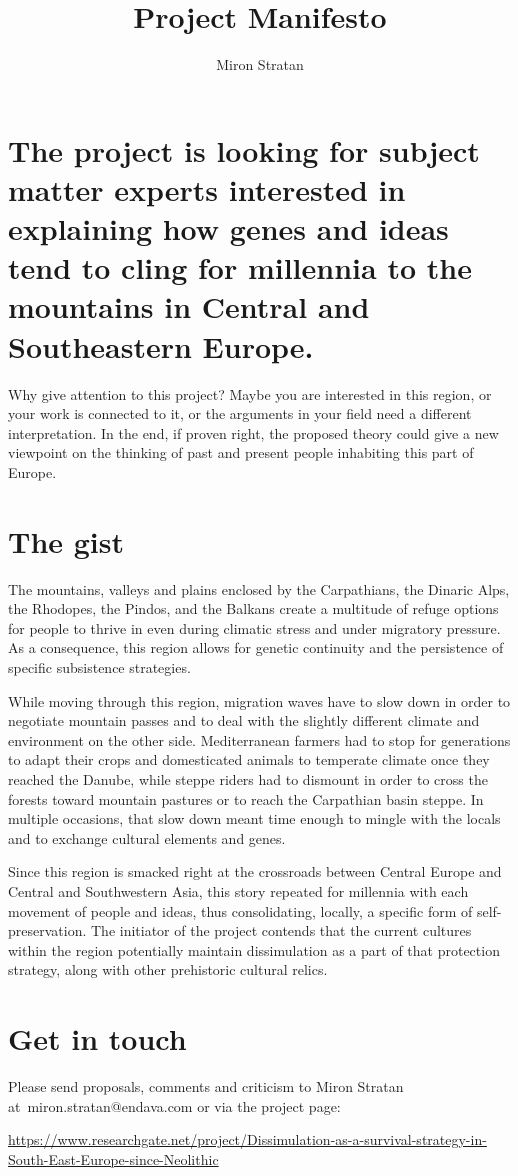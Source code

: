 \documentclass{article}
\title{Project Manifesto}
\author{Miron Stratan}
\begin{document}
\maketitle


\section*{The  project is looking for subject matter experts interested in explaining how genes and ideas tend to cling for millennia to the mountains in Central and Southeastern Europe.}

Why give attention to this project? Maybe you are interested in this region, or your work is connected to it, or the arguments in your field need a different interpretation. In the end, if proven right, the proposed theory could give a new viewpoint on the thinking of past and present people inhabiting this part of Europe.

\section*{The gist}

The mountains, valleys and plains enclosed by the Carpathians, the Dinaric Alps, the Rhodopes, the Pindos, and the Balkans create a multitude of refuge options for people to thrive in even during climatic stress and under migratory pressure. As a consequence, this region allows for genetic continuity and the persistence of specific subsistence strategies.

While moving through this region, migration waves have to slow down in order to negotiate mountain passes and to deal with the slightly different climate and environment on the other side. Mediterranean farmers had to stop for generations to adapt their crops and domesticated animals to temperate climate once they reached the Danube, while steppe riders had to dismount in order to cross the forests toward mountain pastures or to reach the Carpathian basin steppe. In multiple occasions, that slow down meant time enough to mingle with the locals and to exchange cultural elements and genes.

Since this region is smacked right at the crossroads between Central Europe and Central and Southwestern Asia, this story  repeated for millennia with each movement of people and ideas, thus consolidating, locally, a specific form of self-preservation. The initiator of the project contends that the current cultures within the region potentially maintain dissimulation as a part of that protection strategy, along with other prehistoric cultural relics.


\section*{Get in touch}
Please send proposals, comments and criticism to Miron Stratan at~miron.stratan@endava.com or via the project page:


\noindent
\footnotesize
\url{https://www.researchgate.net/project/Dissimulation-as-a-survival-strategy-in-South-East-Europe-since-Neolithic} 
\end{document}
